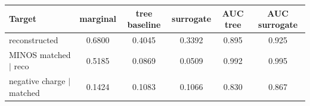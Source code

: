 \begin{tabular}{lccccc}
\toprule
Target & marginal & tree baseline & surrogate & AUC tree & AUC surrogate \\
\midrule
reconstructed & 0.6800 & 0.4045 & 0.3392 & 0.895 & 0.925 \\
MINOS matched $\mid$ reco & 0.5185 & 0.0869 & 0.0509 & 0.992 & 0.995 \\
negative charge $\mid$ matched & 0.1424 & 0.1083 & 0.1066 & 0.830 & 0.867 \\
\bottomrule
\end{tabular}
